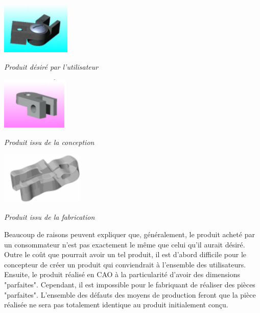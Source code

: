 \documentclass[11pt,oneside]{article}
\begin{document}
\begin{minipage}[c]{.3\linewidth}
\begin{center}
\includegraphics[height=2.5cm]{png/charniere1}

\textit{Produit désiré par l'utilisateur}
\end{center}
\end{minipage} \hfill
\begin{minipage}[c]{.3\linewidth}
\begin{center}
\includegraphics[height=2.5cm]{png/charniere2}

\textit{Produit issu de la conception}
\end{center}
\end{minipage} \hfill
\begin{minipage}[c]{.3\linewidth}
\begin{center}
\includegraphics[height=2.5cm]{png/charniere3}

\textit{Produit issu de la fabrication}
\end{center}
\end{minipage}

\vspace{.5cm}


Beaucoup de raisons peuvent expliquer que, généralement, le produit acheté par un consommateur n'est pas exactement le même que celui qu'il aurait désiré. Outre le coût que pourrait avoir un tel produit, il est d'abord difficile pour le concepteur de créer un produit qui conviendrait à l'ensemble des utilisateurs. Ensuite, le produit réalisé en CAO à la particularité d'avoir des dimensions "parfaites". Cependant, il est impossible pour le fabriquant de réaliser des pièces "parfaites". L'ensemble des défauts des moyens de production feront que la pièce réalisée ne sera pas totalement identique au produit initialement conçu. 
\end{document}
